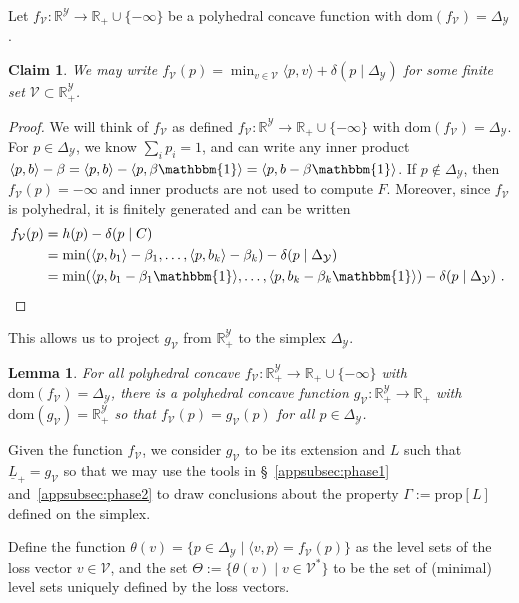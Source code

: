 \documentclass[11pt]{article}
\newcommand{\Comments}{1}
\newcommand{\mynote}[2]{\ifnum\Comments=1\textcolor{#1}{#2}\fi}
\newcommand{\raf}[1]{\mynote{darkgreen}{[RF: #1]}}
\newcommand{\reals}{\mathbb{R}}
\newcommand{\dom}{\mathrm{dom}}
\newcommand{\prop}[1]{\mathrm{prop}[#1]}
\newcommand{\simplex}{\Delta_\Y}
\newcommand{\V}{\mathcal{V}}
\newcommand{\Y}{\mathcal{Y}}
\newcommand{\risk}[1]{\underline{#1}}
\newcommand{\inprod}[2]{\langle #1, #2 \rangle}%
\newcommand{\ones}{\mathbbm{1}}
\newtheorem{lemma}{Lemma}
\newtheorem{claim}{Claim}
\begin{document}
Let $f_\V:\reals^\Y\to\reals_+\cup\{-\infty\}$ be a polyhedral concave function with $\dom(f_\V) = \simplex$.%
\begin{claim}\label{claim:f-min-affine}
	We may write $f_\V(p) = \min_{v\in\V} \inprod{p}{v} + \delta(p \mid \simplex)$ for some finite set $\V \subset \reals^\Y_+$. %
\end{claim}
\begin{proof}
  We will think of $f_\V$ as defined $f_\V:\reals^\Y\to\reals_+\cup\{-\infty\}$  with $\dom(f_\V) = \simplex$.
  For $p \in \simplex$, we know $\sum_i p_i = 1$, and can write any inner product $\inprod{p}{b} - \beta = \inprod{p}{b} - \inprod{p}{\beta \ones} = \inprod{p}{b - \beta \ones}$.
  If $p \not \in \simplex$, then $f_\V(p) = -\infty$ and inner products are not used to compute $F$.
  Moreover, since $f_\V$ is polyhedral, it is finitely generated \citep[Proposition 19.1.2]{rockafellar1997convex} and can be written 
	\begin{align*}
	f_\V(p) &= h(p) - \delta(p \mid C)\\
		 &= \min(\inprod{p}{b_1} - \beta_1, \ldots, \inprod{p}{b_k} - \beta_k) - \delta(p \mid \simplex)\\
		 &= \min(\inprod{p}{b_1 - \beta_1 \ones}, \ldots, \inprod{p}{b_k - \beta_k \ones}) - \delta(p \mid \simplex)~.~
	\end{align*}
\end{proof}

This allows us to project $g_\V$ from $\reals^\Y_+$ to the simplex $\simplex$.
\begin{lemma}\label{cor:f-matches-g-on-simplex}
  For all polyhedral concave $f_\V : \reals^\Y_+ \to \reals_+ \cup \{-\infty\}$ with $\dom(f_\V) = \simplex$, there is a polyhedral concave function $g_\V : \reals^\Y_+ \to \reals_+$ with $\dom(g_\V) = \reals^\Y_+$ so that $f_\V(p) = g_\V(p)$ for all $p \in \simplex$.
\end{lemma}
Given the function $f_\V$, we consider $g_\V$ to be its extension and $L$ such that $\risk L_+ = g_\V$ so that we may use the tools in \S~\ref{appsubsec:phase1} and~\ref{appsubsec:phase2} to draw conclusions about the property $\Gamma := \prop{L}$ defined on the simplex.

Define the function $\theta(v) = \{p \in \simplex \mid \inprod{v}{p} = f_\V(p)\}$ as the level sets of the loss vector $v \in \V$, and the set $\Theta := \{\theta(v) \mid v \in \V^*\}$ to be the set of (minimal) level sets uniquely defined by the loss vectors.
\end{document}
